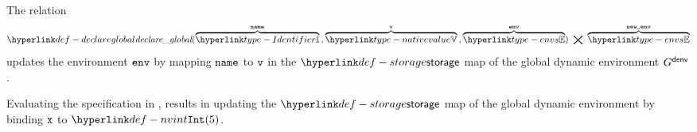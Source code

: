 \ProseParagraph
The relation
\hypertarget{def-declareglobal}{}
\[
  \declareglobal(\overname{\Identifier}{\name} \aslsep \overname{\nativevalue}{\vv} \aslsep \overname{\envs}{\env}) \;\aslrel\; \overname{\envs}{\newenv}
\]
updates the environment $\env$ by mapping $\name$ to $\vv$ in the $\storage$ map of the global dynamic environment $G^\denv$.

Evaluating the specification in , results in updating the $\storage$ map
of the global dynamic environment by binding $\vx$ to $\nvint(5)$.

\FormallyParagraph
\begin{mathpar}
\end{mathpar}
